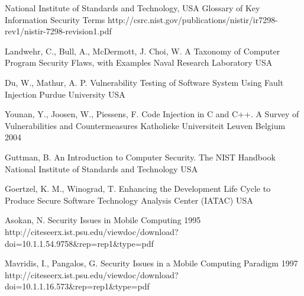 \begin{thebibliography}{9}
		{National Institute of Standards and Technology, USA}
		{Glossary of Key Information Security Terms}
		{}
		{http://csrc.nist.gov/publications/nistir/ir7298-rev1/nistir-7298-revision1.pdf}
		

		{Landwehr, C., Bull, A., McDermott, J. Choi, W.} %
		{A Taxonomy of Computer Program Security Flaws, with Examples}
		{Naval Research Laboratory}
		{USA}
		{}
		
		{Du, W., Mathur, A. P.} %
		{Vulnerability Testing of Software System Using Fault Injection}
		{Purdue University}
		{USA}
		{}

		{Younan, Y., Joosen, W., Piessens, F.} %
		{Code Injection in {C} and {C++}. A Survey of Vulnerabilities and Countermeasures}
		{Katholieke Universiteit Leuven}
		{Belgium}
		{2004}
		
		{Guttman, B.} %
		{An Introduction to Computer Security. The {NIST} Handbook}
		{National Institute of Standards and Technology}
		{USA}
		{}
	
		{Goertzel, K. M., Winograd, T.} %
		{Enhancing the Development Life Cycle to Produce Secure Software}
		{Technology Analysis Center (IATAC)}
		{USA}
		{}



		{Asokan, N.} %
		{Security Issues in Mobile Computing}	
		{1995}	
		{http://citeseerx.ist.psu.edu/viewdoc/download?doi=10.1.1.54.9758\&rep=rep1\&type=pdf}
		
		{Mavridis, I., Pangalos, G.} %
		{Security Issues in a Mobile Computing Paradigm}	
		{1997}	
		{http://citeseerx.ist.psu.edu/viewdoc/download?doi=10.1.1.16.573\&rep=rep1\&type=pdf}
	

\end{thebibliography}
